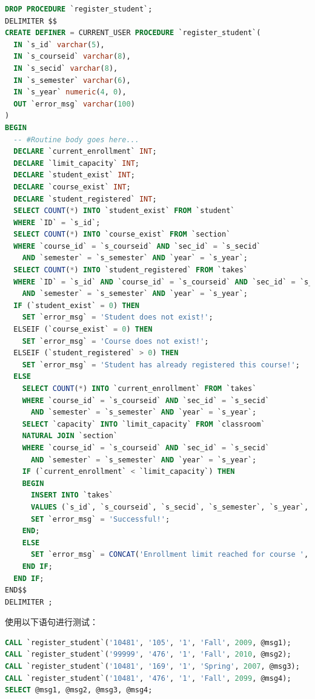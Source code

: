\documentclass{article}
\begin{document}
\begin{enumerate}
        \begin{lstlisting}[language=sql]
DROP PROCEDURE `register_student`;
DELIMITER $$
CREATE DEFINER = CURRENT_USER PROCEDURE `register_student`(
  IN `s_id` varchar(5),
  IN `s_courseid` varchar(8),
  IN `s_secid` varchar(8),
  IN `s_semester` varchar(6),
  IN `s_year` numeric(4, 0),
  OUT `error_msg` varchar(100)
)
BEGIN
  -- #Routine body goes here...
  DECLARE `current_enrollment` INT;
  DECLARE `limit_capacity` INT;
  DECLARE `student_exist` INT;
  DECLARE `course_exist` INT;
  DECLARE `student_registered` INT;
  SELECT COUNT(*) INTO `student_exist` FROM `student`
  WHERE `ID` = `s_id`;
  SELECT COUNT(*) INTO `course_exist` FROM `section`
  WHERE `course_id` = `s_courseid` AND `sec_id` = `s_secid`
    AND `semester` = `s_semester` AND `year` = `s_year`;
  SELECT COUNT(*) INTO `student_registered` FROM `takes`
  WHERE `ID` = `s_id` AND `course_id` = `s_courseid` AND `sec_id` = `s_secid`
    AND `semester` = `s_semester` AND `year` = `s_year`;
  IF (`student_exist` = 0) THEN
    SET `error_msg` = 'Student does not exist!';
  ELSEIF (`course_exist` = 0) THEN
    SET `error_msg` = 'Course does not exist!';
  ELSEIF (`student_registered` > 0) THEN
    SET `error_msg` = 'Student has already registered this course!';
  ELSE
    SELECT COUNT(*) INTO `current_enrollment` FROM `takes`
    WHERE `course_id` = `s_courseid` AND `sec_id` = `s_secid`
      AND `semester` = `s_semester` AND `year` = `s_year`;
    SELECT `capacity` INTO `limit_capacity` FROM `classroom`
    NATURAL JOIN `section`
    WHERE `course_id` = `s_courseid` AND `sec_id` = `s_secid`
      AND `semester` = `s_semester` AND `year` = `s_year`;
    IF (`current_enrollment` < `limit_capacity`) THEN
    BEGIN
      INSERT INTO `takes` 
      VALUES (`s_id`, `s_courseid`, `s_secid`, `s_semester`, `s_year`, NULL);
      SET `error_msg` = 'Successful!';
    END;
    ELSE
      SET `error_msg` = CONCAT('Enrollment limit reached for course ', `s_courseid`, ' section ', `s_secid`);
    END IF;
  END IF;
END$$
DELIMITER ;
\end{lstlisting}

        使用以下语句进行测试：

        \begin{lstlisting}[language=sql]
CALL `register_student`('10481', '105', '1', 'Fall', 2009, @msg1);
CALL `register_student`('99999', '476', '1', 'Fall', 2010, @msg2);
CALL `register_student`('10481', '169', '1', 'Spring', 2007, @msg3);
CALL `register_student`('10481', '476', '1', 'Fall', 2099, @msg4);
SELECT @msg1, @msg2, @msg3, @msg4;
\end{lstlisting}


\end{enumerate}
\end{document}
